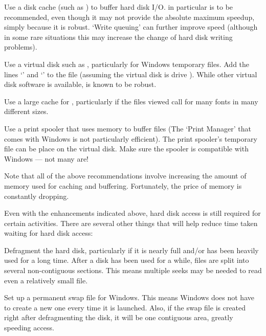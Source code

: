 \beginbullets

\bpar Use a disk cache (such as {\SMARTDRV})  %
to buffer hard disk I/O. 
{\SMARTDRV} in particular is to be recommended, even though it may not
provide the absolute maximum speedup, simply because it is robust.
`Write queuing' can further improve speed (although in some rare 
situations this may increase the change of hard disk writing problems).


\bpar Use a virtual disk such as {\RAMDRV}, 
particularly for Windows temporary files.
Add the lines `' and `' 
to the {\AUTOEXEC} file 
(assuming the virtual disk is drive ).  
While other virtual disk software is available, 
{\RAMDRV} is known to be robust. 


\bpar Use a large cache for {\ATM}, particularly if the {\DVI} files
viewed call for many fonts in many different sizes.

\bpar Use a print spooler that uses {\RAM} memory to buffer files
(The `Print Manager' that comes with Windows is not particularly efficient). 
The print spooler's temporary file can be place on the virtual disk.
Make sure the spooler is compatible with Windows --- 
not many are! %

\endbullets

\noindent
Note that all of the above recommendations involve increasing the
amount of {\RAM} memory used for caching and buffering.
Fortunately, the price of memory is constantly dropping.

Even with the enhancements indicated above,
hard disk access is still required for certain activities.
There are several other things that will help reduce time taken waiting
for hard disk access:

\beginbullets

\bpar Defragment the hard disk, particularly if it is nearly full and/or
has been heavily used for a long time.  
After a disk has been used for a while, files are split into several
non-contiguous sections.
This means multiple seeks may be needed to read even a relatively small file.

\bpar Set up a permanent swap file for Windows. This means Windows
does not have to create a new one every time it is launched. 
Also, if the swap file is created right after defragmenting the disk,
it will be one contiguous area, greatly speeding access.

